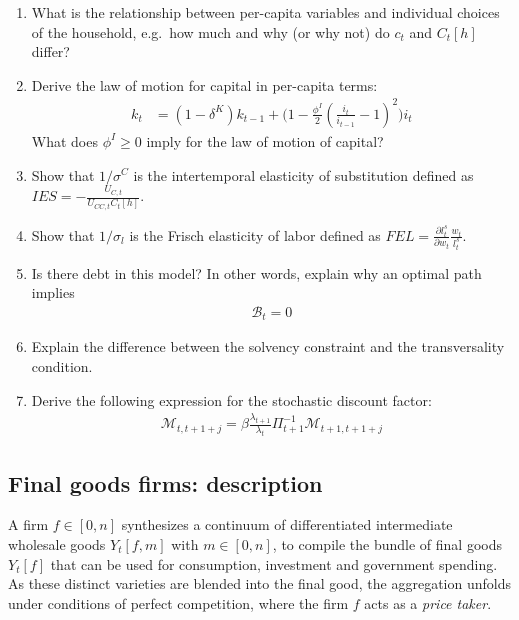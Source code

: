 \begin{enumerate}
\item
What is the relationship between per-capita variables and individual choices of the household,
  e.g.\ how much and why (or why not) do \(c_t\) and \(C_{t}[h]\) differ?

\item
Derive the law of motion for capital in per-capita terms:
\begin{align}
k_{t} &= (1-\delta^{K}) k_{t-1} + \Biggl( 1 - \frac{\phi^{I}}{2} {\left(\frac{i_{t}}{i_{t-1}} - 1 \right)}^2 \Biggr) i_{t} \label{eq:NewKeynesian.CapitalAccumulation.perCapita}
\end{align}
What does \(\phi^{I} \geq 0\) imply for the law of motion of capital?

\item 
Show that \(1/\sigma^{C}\) is the intertemporal elasticity of substitution defined as \(IES = -\frac{U_{C,t}}{U_{CC,t} C_{t}[h]}\).

\item
Show that \(1/\sigma_{l}\) is the Frisch elasticity of labor defined as \(FEL = \frac{\partial l^{s}_{t}}{\partial w_{t}} \frac{w_{t}}{l^{s}_{t}}\).

\item
Is there debt in this model? In other words, explain why an optimal path implies
\begin{align}
\mathcal{B}_{t} = 0 \label{eq:NewKeynesian.MarketClearing.Bonds}
\end{align}

\item
Explain the difference between the solvency constraint and the transversality condition.

\item
Derive the following expression for the stochastic discount factor:
\begin{align}
\mathcal{M}_{t,t+1+j} = \beta \frac{\lambda_{t+1}}{\lambda_t} \Pi_{t+1}^{-1} \mathcal{M}_{t+1,t+1+j} \label{eq:NewKeynesian.StochasticDiscountFactorRecursive}
\end{align}

\end{enumerate}

\newpage

\subsection{Final goods firms: description}
A firm \(f \in [0,n]\) synthesizes a continuum of differentiated intermediate wholesale goods \(Y_{t}[f,m]\) with \(m \in [0,n]\),
  to compile the bundle of final goods \(Y_{t}[f]\) that can be used for consumption, investment and government spending.
As these distinct varieties are blended into the final good,
  the aggregation unfolds under conditions of perfect competition,
  where the firm \(f\) acts as a \emph{price taker}.

